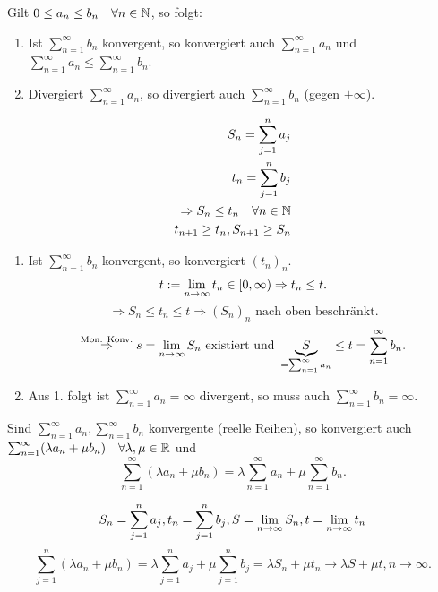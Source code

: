 \documentclass[../ana1.tex]{subfiles}
\begin{document}
\begin{satz}
	Gilt \(0\leq a_n \leq b_n \quad \forall n\in\mathbb{N} \), so folgt:
	\begin{enumerate}
		\item Ist \( \sum_{n=1}^{\infty}b_n \) konvergent, so konvergiert auch \( \sum_{n=1}^{\infty}a_n \) und \( \sum_{n=1}^{\infty} a_n \leq \sum_{n=1}^{\infty}b_n \).
		\item Divergiert \( \sum_{n=1}^{\infty}a_n \), so divergiert auch \( \sum_{n=1}^{\infty}b_n \) (gegen \(+\infty\)).
	\end{enumerate}
\end{satz}
\begin{bew}
	\begin{align*}
		S_n = \sum_{j=1}^{n}a_j\\
		t_n = \sum_{j=1}^{n}b_j\\
		\Rightarrow S_n \leq t_n \quad \forall n\in\mathbb{N}\\
		t_{n+1}\geq t_n, S_{n+1}\geq S_n
	\end{align*}
	\begin{enumerate}
		\item Ist \( \sum_{n=1}^{\infty}b_n \) konvergent, so konvergiert \((t_n)_n\).\\
		\[ t:= \lim\limits_{n\rightarrow\infty}t_n\in [0,\infty) \Rightarrow t_n \leq t. \]
		\[ \Rightarrow S_n \leq t_n \leq t \Rightarrow (S_n)_n \text{ nach oben beschränkt.} \]
		\[ \overset{\text{Mon. Konv.}}{\Rightarrow} s = \lim\limits_{n\rightarrow\infty} S_n \text{ existiert und } \underbrace{S}_{= \sum_{n=1}^{\infty}a_n} \leq t = \sum_{n=1}^{\infty} b_n. \]
		\item Aus 1. folgt ist \( \sum_{n=1}^{\infty}a_n =\infty \) divergent, so muss auch \( \sum_{n=1}^{\infty}b_n = \infty \).
	\end{enumerate}
\end{bew}
\begin{satz}
	Sind \( \sum_{n=1}^{\infty}a_n, \sum_{n=1}^{\infty}b_n \) konvergente (reelle Reihen), so konvergiert auch \( \sum_{n=1}^{\infty}(\lambda a_n + \mu b_n) \quad \forall \lambda, \mu \in\mathbb{R} \) und 
	\[ \sum_{n=1}^{\infty} (\lambda a_n + \mu b_n) = \lambda \sum_{n=1}^{\infty}a_n + \mu \sum_{n=1}^{\infty}b_n. \]
\end{satz}
\begin{bew}
	\[ S_n = \sum_{j=1}^{n}a_j, t_n = \sum_{j=1}^{n}b_j, S = \lim\limits_{n\rightarrow\infty}S_n, t = \lim\limits_{n\rightarrow\infty}t_n \]
	\[ \sum_{j=1}^{n}(\lambda a_n + \mu b_n) = \lambda\sum_{j=1}^{n}a_j + \mu \sum_{j=1}^{n}b_j = \lambda S_n + \mu t_n \rightarrow \lambda S + \mu t, n\rightarrow\infty. \]
\end{bew}
\end{document}
